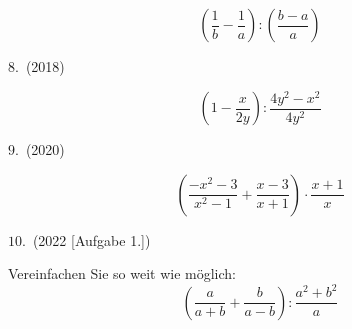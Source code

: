 $$\left(\frac{1}{b} - \frac{1}{a}\right) : \left(\frac{b-a}{a}\right)$$
\TRAINER{\newpage}

$8.$\ (2018)

$$\left(1-\frac{x}{2y}\right) : \frac{4y^2 - x^2}{4y^2} $$


$9.$\ (2020)

$$\left(\frac{-x^2-3}{x^2-1} + \frac{x-3}{x+1}\right)\cdot{} \frac{x+1}{x}$$


$10.$\ (2022 [Aufgabe 1.])

Vereinfachen Sie so weit wie möglich:
$$\left( \frac{a}{a+b}  + \frac{b}{a-b} \right) : \frac{a^2+b^2}{a}$$


